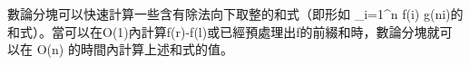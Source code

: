數論分塊可以快速計算一些含有除法向下取整的和式（即形如 \sum_{i=1}^{n} f(i) g(\left\lfloor\dfrac ni\right\rfloor)的和式）。當可以在O(1)內計算f(r)-f(l)或已經預處理出f的前綴和時，數論分塊就可以在 O(\sqrt n) 的時間內計算上述和式的值。